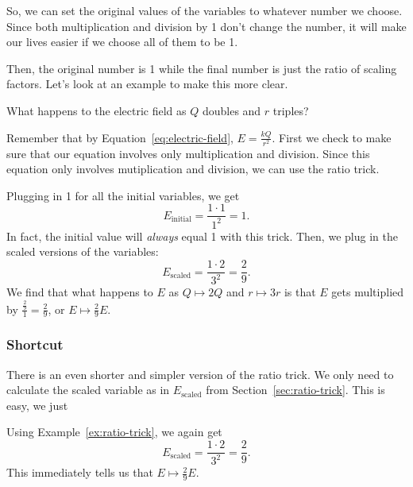\documentclass[12pt,paper=letter]{scrartcl}
\begin{document}
    \pnp

    So, we can set the original values of the variables to whatever number we choose.
    Since both multiplication and division by 1 don't change the number,
    it will make our lives easier if we choose all of them to be 1.

    \pnp

    Then, the original number is 1 while the final number is just the ratio of scaling factors.
    Let's look at an example to make this more clear.

    \begin{exboxed}
        What happens to the electric field as $Q$ doubles and $r$ triples?
        \label{ex:ratio-trick}
    \end{exboxed}

    Remember that by Equation~\ref{eq:electric-field},
    $E=\frac{kQ}{r^2}$.
    First we check to make sure that our equation involves only multiplication and division.
    Since this equation only involves mutiplication and division,
    we can use the ratio trick.

    \pnp

    Plugging in 1 for all the initial variables,
    we get
    \[E_{\text{initial}}=\frac{1\cdot1}{1^2}=1.\]
    In fact, the initial value will \emph{always} equal 1 with this trick.
    Then, we plug in the scaled versions of the variables:
    \[E_{\text{scaled}}=\frac{1\cdot2}{3^2}=\frac{2}{9}.\]
    We find that what happens to $E$ as $Q\mapsto2Q$ and $r\mapsto3r$ is that $E$ gets multiplied by $\frac{\frac{2}{9}}{1}=\frac{2}{9}$,
    or $\boxed{E\mapsto\frac{2}{9}E}$.

    \subsubsection{Shortcut}

    There is an even shorter and simpler version of the ratio trick.
    We only need to calculate the scaled variable as in $E_\text{scaled}$ from Section~\ref{sec:ratio-trick}.
    This is easy, we just

    \pnp

    Using Example~\ref{ex:ratio-trick},
    we again get \[E_{\text{scaled}}=\frac{1\cdot2}{3^2}=\frac{2}{9}.\]
    This immediately tells us that $\boxed{E\mapsto\frac{2}{9}E}$.
\end{document}

